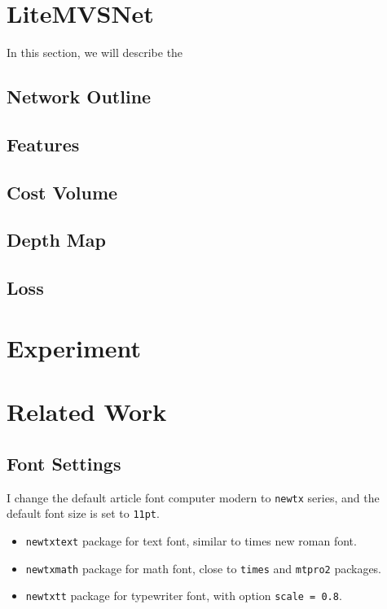 \documentclass{elegantpaper}
\begin{document}
\section{LiteMVSNet}

In this section, we will describe the

\subsection{Network Outline}

\subsection{Features}

\subsection{Cost Volume}

\subsection{Depth Map}

\subsection{Loss}


\section{Experiment}




\section{Related Work}



\subsection{Font Settings}
I change the default article font computer modern to \verb|newtx| series, and the default font size is set to \verb|11pt|.

\begin{itemize}[noitemsep]
	\item \verb|newtxtext| package for text font, similar to times new roman font.
	\item \verb|newtxmath| package for math font, close to \verb|times| and \verb|mtpro2| packages.
	\item \verb|newtxtt| package for typewriter font, with option \verb|scale = 0.8|.
\end{itemize}
\end{document}
